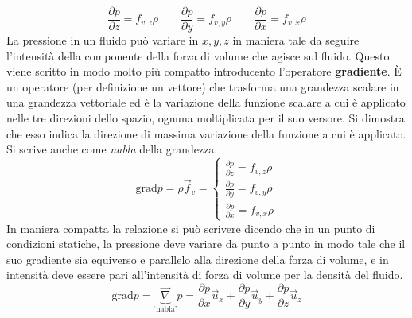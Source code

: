 \documentclass[10pt,a4paper]{book}
\begin{document}
\[
	\frac{\partial p}{\partial z}  = f_{v,z}\rho \qquad \frac{\partial p}{\partial y}  = f_{v,y}\rho \qquad \frac{\partial p}{\partial x}  = f_{v,x}\rho
\]
La pressione in un fluido può variare in $x, y, z$ in maniera tale da seguire l'intensità della componente della forza di volume che agisce sul fluido. Questo viene scritto in modo molto più compatto introducento l'operatore \textbf{gradiente}.  È un operatore (per definizione un vettore) che trasforma una grandezza scalare in una grandezza vettoriale ed è la variazione della funzione scalare a cui è applicato nelle tre direzioni dello spazio, ognuna moltiplicata per il suo versore.  Si dimostra che esso indica la direzione di massima variazione della funzione a cui è applicato. Si scrive anche come \emph{nabla} della grandezza.
\[
	\text{grad}p = \rho \vec{f}_v = \left\{ \begin{array}{r}
	 	\frac{\partial p}{\partial z} = f_{v,z}\rho \\
	 	\frac{\partial p}{\partial y} = f_{v,y}\rho \\
	 	\frac{\partial p}{\partial x} = f_{v,x}\rho
	\end{array} \right.
\]
In maniera compatta la relazione si può scrivere dicendo che in un punto di condizioni statiche, la pressione deve variare da punto a punto in modo tale che il suo gradiente sia equiverso e parallelo alla direzione della forza di volume, e in intensità deve essere pari all'intensità di forza di volume per la densità del fluido.
\[
	\text{grad}p = \underbrace{\vec{\nabla}}_\text{`nabla'} p = \frac{\partial p}{\partial x} \vec{u}_x + \frac{\partial p}{\partial y} \vec{u}_y + \frac{\partial p}{\partial z} \vec{u}_z
\]
\end{document}
